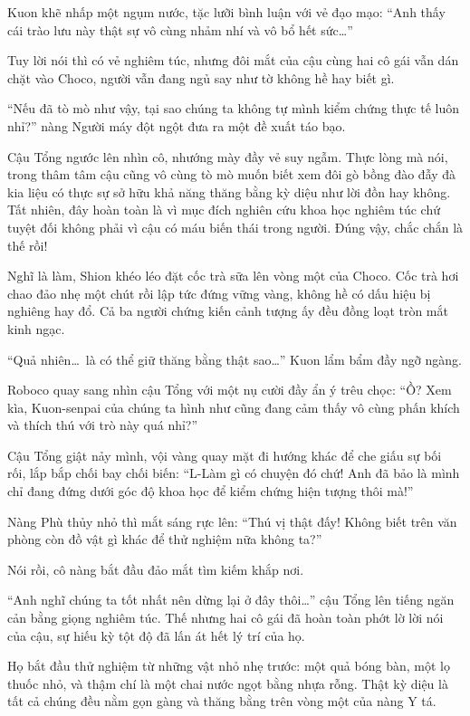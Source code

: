 \documentclass[../main.tex]{subfiles}
\begin{document}
Kuon khẽ nhấp một ngụm nước, tặc lưỡi bình luận với vẻ đạo mạo:
``Anh thấy cái trào lưu này thật sự vô cùng nhảm nhí và vô bổ hết sức\dots''

Tuy lời nói thì có vẻ nghiêm túc, nhưng đôi mắt của cậu cùng hai cô gái vẫn dán chặt vào Choco, người vẫn đang ngủ say như tờ không hề hay biết gì.

``Nếu đã tò mò như vậy, tại sao chúng ta không tự mình kiểm chứng thực tế luôn nhỉ?'' nàng Người máy đột ngột đưa ra một đề xuất táo bạo.

Cậu Tổng ngước lên nhìn cô, nhướng mày đầy vẻ suy ngẫm. Thực lòng mà nói, trong thâm tâm cậu cũng vô cùng tò mò muốn biết xem đôi gò bồng đào đẫy đà kia liệu có thực sự sở hữu khả năng thăng bằng kỳ diệu như lời đồn hay không. Tất nhiên, đây hoàn toàn là vì mục đích nghiên cứu khoa học nghiêm túc chứ tuyệt đối không phải vì cậu có máu biến thái trong người. Đúng vậy, chắc chắn là thế rồi!

Nghĩ là làm, Shion khéo léo đặt cốc trà sữa lên vòng một của Choco. Cốc trà hơi chao đảo nhẹ một chút rồi lập tức đứng vững vàng, không hề có dấu hiệu bị nghiêng hay đổ. Cả ba người chứng kiến cảnh tượng ấy đều đồng loạt tròn mắt kinh ngạc.


``Quả nhiên\dots\ là có thể giữ thăng bằng thật sao\dots'' Kuon lẩm bẩm đầy ngỡ ngàng.

Roboco quay sang nhìn cậu Tổng với một nụ cười đầy ẩn ý trêu chọc:
``Ồ? Xem kìa, Kuon-senpai của chúng ta hình như cũng đang cảm thấy vô cùng phấn khích và thích thú với trò này quá nhỉ?''

Cậu Tổng giật nảy mình, vội vàng quay mặt đi hướng khác để che giấu sự bối rối, lắp bắp chối bay chối biến:
``L-Làm gì có chuyện đó chứ! Anh đã bảo là mình chỉ đang đứng dưới góc độ khoa học để kiểm chứng hiện tượng thôi mà!''

Nàng Phù thủy nhỏ thì mắt sáng rực lên:
``Thú vị thật đấy! Không biết trên văn phòng còn đồ vật gì khác để thử nghiệm nữa không ta?''

Nói rồi, cô nàng bắt đầu đảo mắt tìm kiếm khắp nơi.

``Anh nghĩ chúng ta tốt nhất nên dừng lại ở đây thôi\dots'' cậu Tổng lên tiếng ngăn cản bằng giọng nghiêm túc. Thế nhưng hai cô gái đã hoàn toàn phớt lờ lời nói của cậu, sự hiếu kỳ tột độ đã lấn át hết lý trí của họ.

Họ bắt đầu thử nghiệm từ những vật nhỏ nhẹ trước: một quả bóng bàn, một lọ thuốc nhỏ, và thậm chí là một chai nước ngọt bằng nhựa rỗng. Thật kỳ diệu là tất cả chúng đều nằm gọn gàng và thăng bằng trên vòng một của nàng Y tá.
\end{document}
